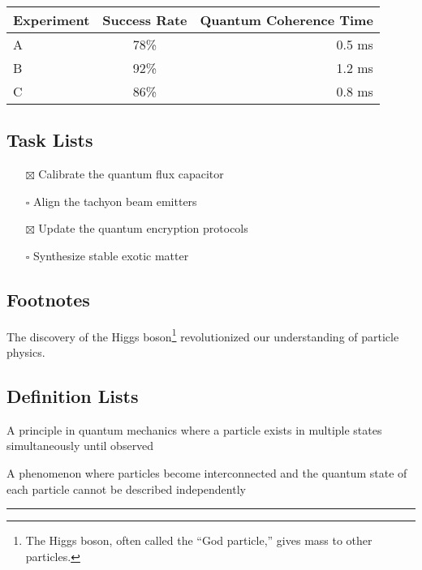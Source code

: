 \begin{longtable}[]{@{}lcr@{}}
\toprule\noalign{}
Experiment & Success Rate & Quantum Coherence Time \\
\midrule\noalign{}
\endhead
\bottomrule\noalign{}
\endlastfoot
A & 78\% & 0.5 ms \\
B & 92\% & 1.2 ms \\
C & 86\% & 0.8 ms \\
\end{longtable}

\subsection{Task Lists}\label{task-lists}

\begin{itemize}
\tightlist
\item[$\boxtimes$]
  Calibrate the quantum flux capacitor
\item[$\square$]
  Align the tachyon beam emitters
\item[$\boxtimes$]
  Update the quantum encryption protocols
\item[$\square$]
  Synthesize stable exotic matter
\end{itemize}

\subsection{Footnotes}\label{footnotes}

The discovery of the Higgs boson\footnote{The Higgs boson, often called
  the ``God particle,'' gives mass to other particles.} revolutionized
our understanding of particle physics.

\subsection{Definition Lists}\label{definition-lists}

\begin{description}
\tightlist
\item[Quantum Superposition]
A principle in quantum mechanics where a particle exists in multiple
states simultaneously until observed
\item[Entanglement]
A phenomenon where particles become interconnected and the quantum state
of each particle cannot be described independently
\end{description}

\begin{center}\rule{0.5\linewidth}{0.5pt}\end{center}

